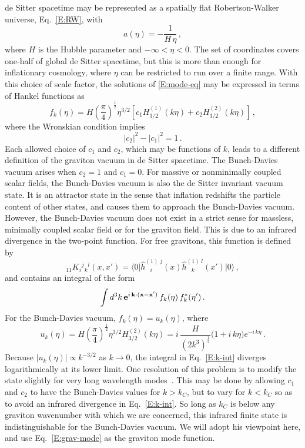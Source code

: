 \documentclass[preprint,prd,showpacs,superscriptaddress]{revtex4}
\begin{document}
de Sitter spacetime may be represented as a spatially flat Robertson-Walker universe, Eq.~\eqref{E:RW}, with
\begin{equation}
a(\eta) = -\frac{1}{H\, \eta}\,,
\end{equation}
where $H$ is the Hubble parameter and $-\infty < \eta < 0$. The set of coordinates covers one-half of global
de Sitter spacetime, but this is more than enough for inflationary cosmology, where $\eta$ can be restricted to run
over a finite range. With this choice of scale factor, the solutions of \eqref{E:mode-eq} may be expressed in terms
of Hankel functions as
\begin{equation}
f_k(\eta) = H\left(\frac{\pi}{4}\right)^{\frac{1}{2}}\eta^{3/2}
 \left[c_1  H_{3/2}^{(1)}(k\eta) +c_2 H_{3/2}^{(2)}(k\eta) \right]\,,
\end{equation}
where the Wronskian condition implies
\begin{equation}
|c_2|^2 - |c_1|^2 =1 \,.
\end{equation}
Each allowed choice of $c_1$ and $c_2$, which may be functions of $k$, leads to a different definition of the graviton  
vacuum in de Sitter spacetime. The Bunch-Davies vacuum arises when  $c_2=1$ and $c_1=0$. For 
massive or nonminimally coupled scalar fields, the Bunch-Davies vacuum is also the de Sitter invariant vacuum state.
It is an attractor state in the sense that inflation redshifts the particle content of other states, and causes
them to approach the Bunch-Davies vacuum. However, the Bunch-Davies vacuum does not exist in a strict sense
for massless, minimally coupled scalar field or for the graviton field. This is due to an infrared divergence in the
two-point function. For free gravitons, this function is defined by
\begin{equation}
{}_{11}K_{i}{}^{j}{}_{k}{}^{l}(x,x')=\langle 0 \vert\hat{h}^{(1)\;j}_{\;\;\; i}(x)\hat{h}^{(1)\;l}_{\;\;\; k}(x')\vert0\rangle\,,
\label{E:grav-2pt}
\end{equation}
and contains an integral of the form
\begin{equation}
\int d^3k \, {\bf e}^{i\,\mathbf{k}\cdot(\mathbf{x} - \mathbf{x'} )} \,f_k(\eta)\, f^*_k(\eta')\,.
\label{E:k-int}
\end{equation}
For the  Bunch-Davies vacuum, $f_k(\eta) = u_k(\eta)$, where
\begin{equation}
u_{k}(\eta)=H\left(\frac{\pi}{4}\right)^{\frac{1}{2}}\eta^{3/2}H_{3/2}^{(2)}(k\eta)=
i\,\frac{H}{(2k^{3})^{\frac{1}{2}}}\bigl(1+i\,k\eta\bigr)e^{-i\,k\eta}\,.
\label{E:grav-mode}
\end{equation}
Because $|u_k(\eta)| \propto k^{-3/2}$ as $k \rightarrow 0$, the integral in Eq.~\eqref{E:k-int} diverges logarithmically at its lower
limit. One resolution of this problem is to modify the state slightly for very long wavelength modes~\cite{FP77IR}. This may be done by
allowing $c_1$ and $c_2$ to have the Bunch-Davies values for $k>k_C$, but to vary for $k<k_C$ so as to avoid an
infrared divergence in Eq.~\eqref{E:k-int}. So long as $k_C$ is below any graviton wavenumber with which we are concerned,
this infrared finite state is indistinguishable for the Bunch-Davies vacuum. We will adopt his viewpoint here, and use
Eq.~\eqref{E:grav-mode} as the graviton mode function.
\end{document}
